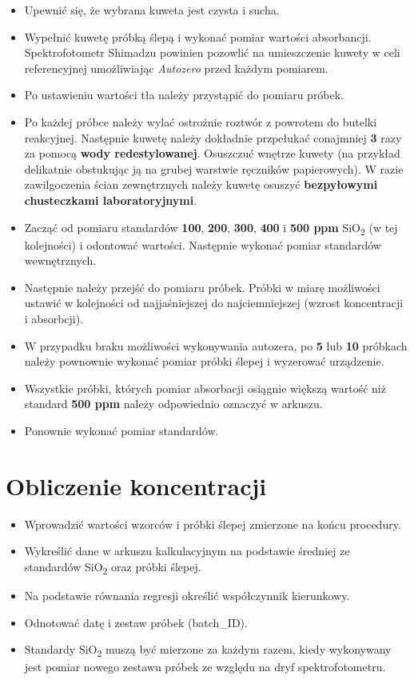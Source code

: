 \documentclass[
  letterpaper,
  DIV=11,
  numbers=noendperiod]{scrreprt}
\providecommand{\tightlist}{%
  \setlength{\itemsep}{0pt}\setlength{\parskip}{0pt}}\usepackage{longtable,booktabs,array}
\begin{document}
\begin{itemize}
\tightlist
\item
  Upewnić się, że wybrana kuweta jest czysta i sucha.
\item
  Wypełnić kuwetę próbką ślepą i wykonać pomiar wartości absorbancji.
  Spektrofotometr Shimadzu powinien pozowlić na umieszczenie kuwety w
  celi referencyjnej umożliwiając \emph{Autozero} przed każdym pomiarem.
\item
  Po ustawieniu wartości tła należy przystąpić do pomiaru próbek.
\item
  Po każdej próbce należy wylać ostrożnie roztwór z powrotem do butelki
  reakcyjnej. Następnie kuwetę należy dokładnie przpełukać conajmniej
  \textbf{3} razy za pomocą \textbf{wody redestylowanej}. Osuszczuć
  wnętrze kuwety (na przykład delikatnie obstukując ją na grubej
  warstwie ręczników papierowych). W razie zawilgoczenia ścian
  zewnętrznych należy kuwetę osuszyć \textbf{bezpyłowymi chusteczkami
  laboratoryjnymi}.
\item
  Zacząć od pomiaru standardów \textbf{100}, \textbf{200}, \textbf{300},
  \textbf{400} i \textbf{500 ppm} SiO\textsubscript{2} (w tej
  kolejności) i odontować wartości. Następnie wykonać pomiar standardów
  wewnętrznych.
\item
  Następnie należy przejść do pomiaru próbek. Próbki w miarę możliwości
  ustawić w kolejności od najjaśniejszej do najciemniejszej (wzrost
  koncentracji i absorbcji).
\item
  W przypadku braku możliwości wykonywania autozera, po \textbf{5} lub
  \textbf{10} próbkach należy pownownie wykonać pomiar próbki ślepej i
  wyzerować urządzenie.
\item
  Wszystkie próbki, których pomiar absorbacji osiągnie większą wartość
  niż standard \textbf{500 ppm} należy odpowiednio oznaczyć w arkuszu.
\item
  Ponownie wykonać pomiar standardów.
\end{itemize}

\hypertarget{obliczenie-koncentracji}{%
\section{Obliczenie koncentracji}\label{obliczenie-koncentracji}}

\begin{itemize}
\tightlist
\item
  Wprowadzić wartości wzorców i próbki ślepej zmierzone na końcu
  procedury.
\item
  Wykreślić dane w arkuszu kalkulacyjnym na podstawie średniej ze
  standardów SiO\textsubscript{2} oraz próbki ślepej.
\item
  Na podstawie równania regresji określić współczynnik kierunkowy.
\item
  Odnotować datę i zestaw próbek (batch\_ID).
\item
  Standardy SiO\textsubscript{2} muszą być mierzone za każdym razem,
  kiedy wykonywany jest pomiar nowego zestawu próbek ze względu na dryf
  spektrofotometru.
\end{itemize}
\end{document}
